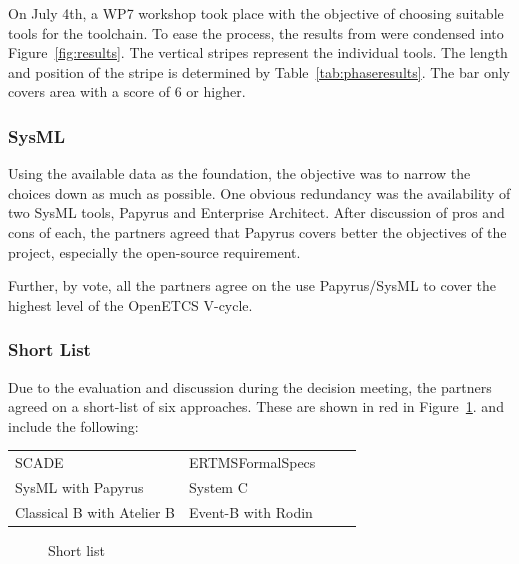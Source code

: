 On July 4th, a WP7 workshop took place with the objective of choosing suitable tools for the toolchain.  To ease the process, the results from \citep{WP7_O719} were condensed into Figure~\ref{fig:results}.  The vertical stripes represent the individual tools.  The length and position of the stripe is determined by Table~\ref{tab:phaseresults}. The bar only covers area with a score of 6 or higher.

\subsubsection{SysML}

Using the available data as the foundation, the objective was to narrow the choices down as much as possible.  One obvious redundancy was the availability of two SysML tools, Papyrus and Enterprise Architect. After discussion of pros and cons of each, the partners agreed that Papyrus covers better the objectives of the project, especially the open-source requirement. 

Further, by vote, all the partners agree on the use Papyrus/SysML to cover the highest level of the  OpenETCS V-cycle.

\subsubsection{Short List}

Due to the evaluation and discussion during the decision meeting, the partners agreed on a short-list of six approaches. These are shown in red in Figure~\ref{fig:short}. and include the following:

\begin{tabular}{ p{0.5\linewidth} p{0.5\linewidth} }
SCADE & ERTMSFormalSpecs \\
SysML with Papyrus & System C \\
Classical B with Atelier B & Event-B with Rodin
\end{tabular}


 \begin{figure}
  \centering
  \caption{Short list}
  \label{fig:short}
\end{figure}

